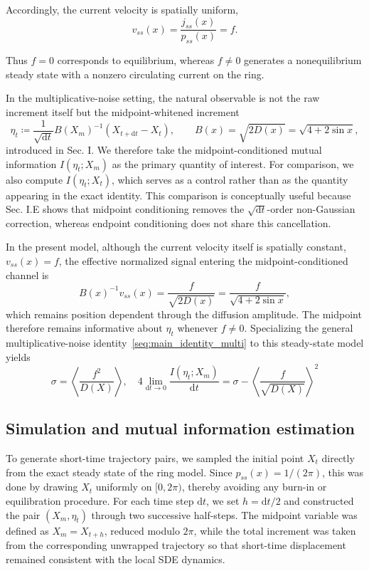 \documentclass[
 longbibliography,
 twocolumn,
 superscriptaddress,
 amsmath,
 amssymb,
 amsthm,
 amsfonts,
 prl,
 floatfix,
]{revtex4-2}
\begin{document}
\begin{widetext}
Accordingly, the current velocity is spatially uniform,
\[
    v_{ss}(x)=\frac{j_{ss}(x)}{p_{ss}(x)}=f.
\]

Thus $f=0$ corresponds to equilibrium, whereas $f\neq0$ generates a nonequilibrium steady state with a nonzero circulating current on the ring.

In the multiplicative-noise setting, the natural observable is not the raw increment itself but the midpoint-whitened increment
\[
    \eta_t\coloneq\frac{1}{\sqrt{\mathrm dt}}B(X_m)^{-1}
    (X_{t+\mathrm dt}-X_t),
    \qquad B(x)=\sqrt{2D(x)}=\sqrt{4+2\sin x},
\]
introduced in Sec. I. We therefore take the midpoint-conditioned mutual information $I(\eta_t;X_m)$ as the primary quantity of interest. For comparison, we also compute $I(\eta_t;X_t)$, which serves as a control rather than as the quantity appearing in the exact identity. This comparison is conceptually useful because Sec. I.E shows that midpoint conditioning removes the $\sqrt{\mathrm dt}$-order non-Gaussian correction, whereas endpoint conditioning does not share this cancellation.

In the present model, although the current velocity itself is spatially constant, $v_{ss}(x)=f$, the effective normalized signal entering the midpoint-conditioned channel is
\[
    B(x)^{-1}v_{ss}(x)=\frac{f}{\sqrt{2D(x)}}
    =\frac{f}{\sqrt{4+2\sin x}},
\]
which remains position dependent through the diffusion amplitude. The midpoint therefore remains informative about $\eta_t$ whenever $f\neq0$. Specializing the general multiplicative-noise identity~\eqref{seq:main_identity_multi} to this steady-state model yields
\[
    \sigma=\left\langle\frac{f^2}{D(X)}\right\rangle,
    \quad4\lim_{\mathrm dt\rightarrow 0}
    \frac{I(\eta_t;X_m)}{\mathrm dt}
    =\sigma-\left\langle\frac{f}{\sqrt{D(X)}}\right\rangle^2
\]

\subsection{Simulation and mutual information estimation}
\vspace*{-0.6\baselineskip}

To generate short-time trajectory pairs, we sampled the initial point $X_t$ directly from the exact steady state of the ring model. Since $p_{ss}(x)=1/(2\pi)$, this was done by drawing $X_t$ uniformly on $[0,2\pi)$, thereby avoiding any burn-in or equilibration procedure. For each time step $\mathrm dt$, we set $h=\mathrm dt/2$ and constructed the pair $(X_m,\eta_t)$ through two successive half-steps. The midpoint variable was defined as $X_m=X_{t+h}$, reduced modulo $2\pi$, while the total increment was taken from the corresponding unwrapped trajectory so that short-time displacement remained consistent with the local SDE dynamics.


\end{widetext}
\end{document}
